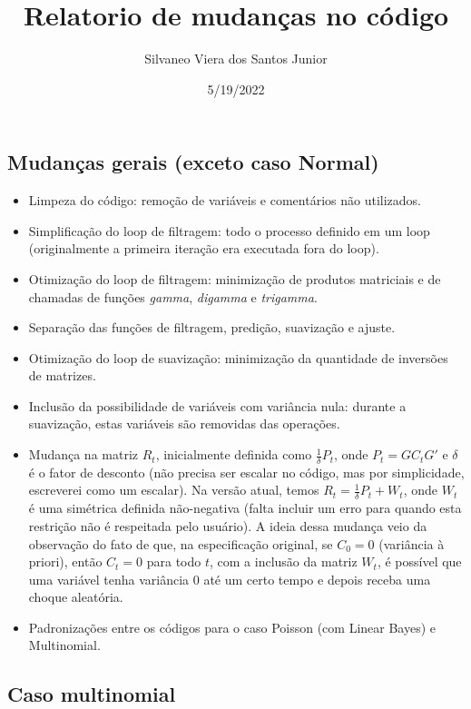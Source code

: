 \documentclass[
]{article}
\title{Relatorio de mudanças no código}
\author{Silvaneo Viera dos Santos Junior}
\date{5/19/2022}
\begin{document}
\maketitle

\hypertarget{mudanuxe7as-gerais-exceto-caso-normal}{%
\subsection{Mudanças gerais (exceto caso
Normal)}\label{mudanuxe7as-gerais-exceto-caso-normal}}

\begin{itemize}
  \item Limpeza do código: remoção de variáveis e comentários não utilizados.
  \item Simplificação do loop de filtragem: todo o processo definido em um loop (originalmente a primeira iteração era executada fora do loop).
  \item Otimização do loop de filtragem: minimização de produtos matriciais e de chamadas de funções \emph{gamma}, \emph{digamma} e \emph{trigamma}.
  \item Separação das funções de filtragem, predição, suavização e ajuste.
  \item Otimização do loop de suavização: minimização da quantidade de inversões de matrizes.
  \item Inclusão da possibilidade de variáveis com variância nula: durante a suavização, estas variáveis são removidas das operações.
  \item Mudança na matriz $R_t$, inicialmente definida como $\frac{1}{\delta}P_t$, onde $P_t=G C_t G'$ e $\delta$ é o fator de desconto (não precisa ser escalar no código, mas por simplicidade, escreverei como um escalar). Na versão atual, temos $R_t=\frac{1}{\delta}P_t+W_t$, onde $W_t$ é uma simétrica definida não-negativa (falta incluir um erro para quando esta restrição não é respeitada pelo usuário). A ideia dessa mudança veio da observação do fato de que, na especificação original, se $C_0=0$ (variância à priori), então $C_t=0$ para todo $t$, com a inclusão da matriz $W_t$, é possível que uma variável tenha variância $0$ até um certo tempo e depois receba uma choque aleatória.
  \item Padronizações entre os códigos para o caso Poisson (com Linear Bayes) e Multinomial.
\end{itemize}

\hypertarget{caso-multinomial}{%
\subsection{Caso multinomial}\label{caso-multinomial}}
\end{document}
